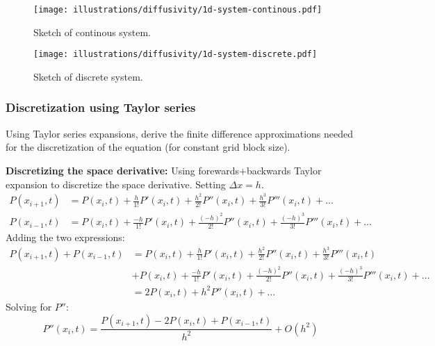 \begin{figure}[H]
  \centering
  \texttt{[image: illustrations/diffusivity/1d-system-continous.pdf]}
  \caption{Sketch of continous system.}
  \label{fig:diffusivity_1d_continous}
\end{figure}

\begin{figure}[H]
  \centering
  \texttt{[image: illustrations/diffusivity/1d-system-discrete.pdf]}
  \caption{Sketch of discrete system.}
  \label{fig:diffusivity_1d_discrete}
\end{figure}


\subsubsection{Discretization using Taylor series} %
\label{ssub:discretization_using_taylor_series}

\begin{question}
  Using Taylor series expansions, derive the finite difference approximations needed for the
discretization of the equation (for constant grid block size).
\end{question}

\noindent \textbf{Discretizing the space derivative:}
Using forewards+backwards  Taylor expansion to discretize the space derivative. Setting $\Delta x = h$.
\begin{align}
  \nonumber
  P(x_{i+1},t) &= P\left(x_{i},t\right)+\frac{h}{1!}P'\left(x_{i},t\right)+\frac{h^{2}}{2!}P''\left(x_{i},t\right)+\frac{h^{3}}{3!}P'''\left(x_{i},t\right)+\dots \\
  \nonumber
  P(x_{i-1},t) &= P\left(x_{i},t\right)+\frac{-h}{1!}P'\left(x_{i},t\right)+\frac{(-h)^{2}}{2!}P''\left(x_{i},t\right)+\frac{(-h)^{3}}{3!}P'''\left(x_{i},t\right)+\dots
\end{align}
Adding the two expressions:
\begin{align}
  \nonumber
  P(x_{i+1},t) + P(x_{i-1},t)
  &= P\left(x_{i},t\right)+\frac{h}{1!}P'\left(x_{i},t\right)+\frac{h^{2}}{2!}P''\left(x_{i},t\right)+\frac{h^{3}}{3!}P'''\left(x_{i},t\right) \\
  &+P\left(x_{i},t\right)+\frac{-h}{1!}P'\left(x_{i},t\right)+\frac{(-h)^{2}}{2!}P''\left(x_{i},t\right)+\frac{(-h)^{3}}{3!}P'''\left(x_{i},t\right)+\dots \nonumber \\
  \nonumber
  &= 2P\left(x_{i},t\right)+h^{2}P''\left(x_{i},t\right)+\dots
\end{align}
Solving for $P''$:
\begin{equation}
  P''\left(x_{i},t\right)=\frac{P\left(x_{i+1},t\right)-2P\left(x_{i},t\right)+P\left(x_{i-1},t\right)}{h^{2}}+O\left(h^{2}\right)
\end{equation}


